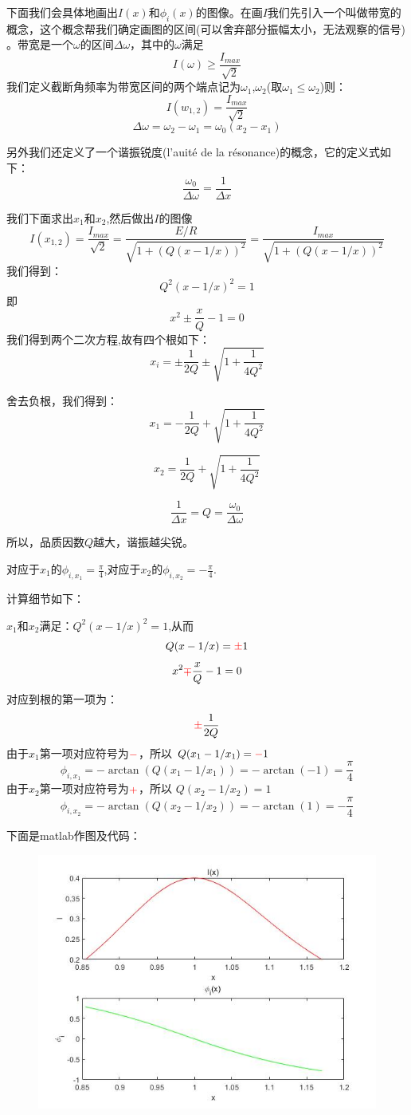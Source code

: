 \documentclass[12pt]{book}
\theoremstyle{definition}\newtheorem{dfn}{Définition}[chapter]
\theoremstyle{plain}\newtheorem{thm}{Théorème}[chapter]
\theoremstyle{plain}\newtheorem{prp}{Proposition}[chapter]
\theoremstyle{plain}\newtheorem{lem}{\bf Lemme}[chapter]
\theoremstyle{plain}\newtheorem{axm}{\bf Axiome}[chapter]
\theoremstyle{plain}\newtheorem{lmm}{\bf Lemme}[chapter]
\theoremstyle{plain}\newtheorem{cor}{\bf Corollaire}[chapter]
\theoremstyle{remark}\newtheorem{rem}{Remarque}[chapter]
\begin{document}
下面我们会具体地画出$I(x)$和$\phi_{i}(x)$的图像。在画$I$我们先引入一个叫做{\color{red}带宽}的概念，这个概念帮我们确定画图的区间(可以舍弃部分振幅太小，无法观察的信号)
。带宽是一个$\omega$的区间$\Delta\omega$，其中的$\omega$满足
$$
I(\omega)\ge\frac{I_{max}}{\sqrt{2}} 
$$
我们定义截断角频率为带宽区间的两个端点记为$\omega_1$,$\omega_2$(取$\omega_1\le\omega_2$)则：
$$
I(w_{1,2})=\frac{I_{max}}{\sqrt{2}} 
$$
$$
\Delta\omega=\omega_2-\omega_1=\omega_0(x_2-x_1)
$$

另外我们还定义了一个{\color{red}谐振锐度(l'auité de la résonance)}的概念，它的定义式如下：
$$
\frac{\omega_0}{\Delta\omega}=\frac{1}{\Delta x}
$$

我们下面求出$x_1$和$x_2$,然后做出$I$的图像
$$
I(x_{1,2})=\frac{I_{max}}{\sqrt{2}} =\frac{E/R}{\sqrt{1+(Q(x-1/x))^2}}
=\frac{I_{max}}{\sqrt{1+(Q(x-1/x))^2}}
$$
我们得到：
$$
Q^2(x-1/x)^2=1
$$
即
$$
x^2\pm\frac{x}{Q}-1=0
$$
我们得到两个二次方程,故有四个根如下：
$$
x_i=\pm\frac{1}{2Q}\pm\sqrt{1+\frac{1}{4Q^2}}
$$

舍去负根，我们得到：
$$
x_1=-\frac{1}{2Q}+\sqrt{1+\frac{1}{4Q^2}}
$$

$$
x_2=\frac{1}{2Q}+\sqrt{1+\frac{1}{4Q^2}}
$$

$$
\frac{1}{\Delta x}=Q=\frac{\omega_0}{\Delta\omega}
$$

所以，品质因数$Q$越大，谐振越尖锐。

对应于$x_1$的$\phi_{i,x_1}=\frac{\pi}{4}$,对应于$x_2$的$\phi_{i,x_2}=-\frac{\pi}{4}$.

计算细节如下：

$x_1$和$x_2$满足：$Q^2(x-1/x)^2=1$,从而
$$
Q(x-1/x)={\color{red}\pm}1
$$
$$
x^2{\color{red}\mp}\frac{x}{Q}-1=0
$$
对应到根的第一项为：
$$
{\color{red}\pm}\frac{1}{2Q}
$$
由于$x_1$第一项对应符号为${\color{red}-}$，所以
$Q(x_1-1/x_1)={\color{red}-}1$
$$
\phi_{i,x_1}=-\arctan(Q(x_1-1/x_1))=-\arctan(-1)=\frac{\pi}{4}
$$
由于$x_2$第一项对应符号为${\color{red}+}$，所以
$Q(x_2-1/x_2)=1$
$$
\phi_{i,x_2}=-\arctan(Q(x_2-1/x_2))=-\arctan(1)=-\frac{\pi}{4}
$$

下面是matlab作图及代码：
\begin{figure}[H]
	\centering
	\includegraphics[scale=0.7]{Etude du circuit RLC serie-Resonances//6}
\end{figure}
\end{document}
